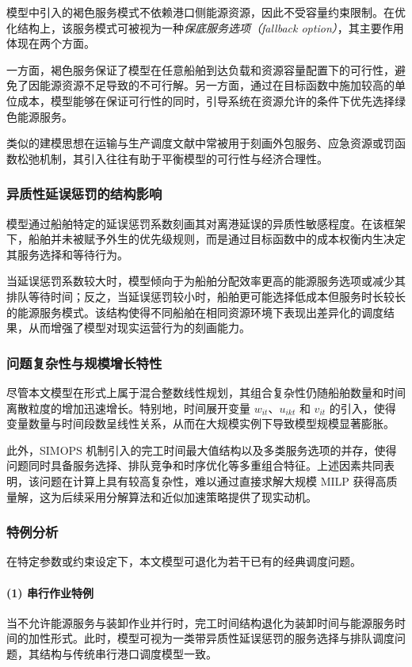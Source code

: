 \documentclass[UTF8, a4paper, 12pt]{ctexart}
\begin{document}
模型中引入的褐色服务模式不依赖港口侧能源资源，因此不受容量约束限制。在优化结构上，该服务模式可被视为一种\emph{保底服务选项（fallback option）}，其主要作用体现在两个方面。

一方面，褐色服务保证了模型在任意船舶到达负载和资源容量配置下的可行性，避免了因能源资源不足导致的不可行解。另一方面，通过在目标函数中施加较高的单位成本，模型能够在保证可行性的同时，引导系统在资源允许的条件下优先选择绿色能源服务。

类似的建模思想在运输与生产调度文献中常被用于刻画外包服务、应急资源或罚函数松弛机制，其引入往往有助于平衡模型的可行性与经济合理性。

\subsubsection{异质性延误惩罚的结构影响}

模型通过船舶特定的延误惩罚系数刻画其对离港延误的异质性敏感程度。在该框架下，船舶并未被赋予外生的优先级规则，而是通过目标函数中的成本权衡内生决定其服务选择和等待行为。

当延误惩罚系数较大时，模型倾向于为船舶分配效率更高的能源服务选项或减少其排队等待时间；反之，当延误惩罚较小时，船舶更可能选择低成本但服务时长较长的能源服务模式。该结构使得不同船舶在相同资源环境下表现出差异化的调度结果，从而增强了模型对现实运营行为的刻画能力。

\subsubsection{问题复杂性与规模增长特性}

尽管本文模型在形式上属于混合整数线性规划，其组合复杂性仍随船舶数量和时间离散粒度的增加迅速增长。特别地，时间展开变量 $w_{it}$、$u_{ikt}$ 和 $v_{it}$ 的引入，使得变量数量与时间段数呈线性关系，从而在大规模实例下导致模型规模显著膨胀。

此外，SIMOPS 机制引入的完工时间最大值结构以及多类服务选项的并存，使得问题同时具备服务选择、排队竞争和时序优化等多重组合特征。上述因素共同表明，该问题在计算上具有较高复杂性，难以通过直接求解大规模 MILP 获得高质量解，这为后续采用分解算法和近似加速策略提供了现实动机。

\subsubsection{特例分析}

在特定参数或约束设定下，本文模型可退化为若干已有的经典调度问题。

\paragraph{(1) 串行作业特例}
当不允许能源服务与装卸作业并行时，完工时间结构退化为装卸时间与能源服务时间的加性形式。此时，模型可视为一类带异质性延误惩罚的服务选择与排队调度问题，其结构与传统串行港口调度模型一致。
\end{document}
